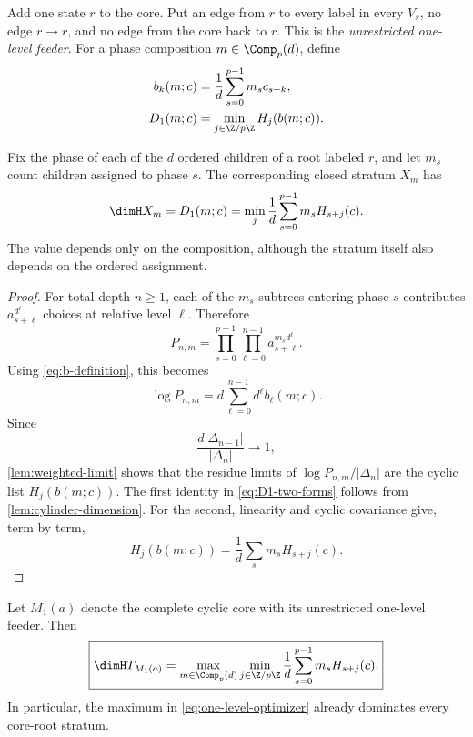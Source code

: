 Add one state $r$ to the core.  Put an edge from $r$ to every label in every
$V_s$, no edge $r\to r$, and no edge from the core back to $r$.  This is the
\emph{unrestricted one-level feeder}.  For a phase composition
$m\in\Comp_p(d)$, define
\begin{align}
 b_k(m;c)&=\frac1d\sum_{s=0}^{p-1}m_s c_{s+k},
 \label{eq:b-definition}\\
 D_1(m;c)&=\min_{j\in\Z/p\Z}H_j(b(m;c)).
 \label{eq:D1-definition}
\end{align}

\begin{proposition}
\label{prop:fixed-one-level}
Fix the phase of each of the $d$ ordered children of a root labeled $r$, and
let $m_s$ count children assigned to phase $s$.  The corresponding closed
stratum $X_m$ has
\begin{equation}
 \dimH X_m=D_1(m;c)
 =\min_j\frac1d\sum_{s=0}^{p-1}m_sH_{s+j}(c).
 \label{eq:D1-two-forms}
\end{equation}
The value depends only on the composition, although the stratum itself also
depends on the ordered assignment.
\end{proposition}

\begin{proof}
For total depth $n\geq1$, each of the $m_s$ subtrees entering phase $s$
contributes $a_{s+\ell}^{d^\ell}$ choices at relative level $\ell$.  Therefore
\begin{equation}
 P_{n,m}=\prod_{s=0}^{p-1}\prod_{\ell=0}^{n-1}
 a_{s+\ell}^{m_s d^\ell}.
 \label{eq:feeder-prefix-count}
\end{equation}
Using \eqref{eq:b-definition}, this becomes
\begin{equation}
 \log P_{n,m}=d\sum_{\ell=0}^{n-1}d^\ell b_\ell(m;c).
 \label{eq:feeder-prefix-log}
\end{equation}
Since
\[
 \frac{d|\Delta_{n-1}|}{|\Delta_n|}\longrightarrow1,
\]
\cref{lem:weighted-limit} shows that the residue limits of
$\log P_{n,m}/|\Delta_n|$ are the cyclic list $H_j(b(m;c))$.
The first identity in \eqref{eq:D1-two-forms} follows from
\cref{lem:cylinder-dimension}.  For the second, linearity and cyclic covariance
give, term by term,
\[
 H_j(b(m;c))=\frac1d\sum_s m_sH_{s+j}(c).
\]
\end{proof}

\begin{theorem}
\label{thm:one-level}
Let $M_1(a)$ denote the complete cyclic core with its unrestricted one-level
feeder.  Then
\begin{equation}
 \boxed{\displaystyle
 \dimH T_{M_1(a)}=
 \max_{m\in\Comp_p(d)}\min_{j\in\Z/p\Z}
 \frac1d\sum_{s=0}^{p-1}m_sH_{s+j}(c).}
 \label{eq:one-level-optimizer}
\end{equation}
In particular, the maximum in \eqref{eq:one-level-optimizer} already
dominates every core-root stratum.
\end{theorem}

